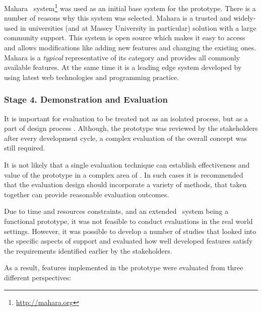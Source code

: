 Mahara \ep~system\footnote{\url{http://mahara.org}} was used as an initial base
system for the prototype. There is a number of reasons why this system was
selected. Mahara is a trusted and widely-used in universities (and at Massey
University in particular) solution with a large community support. This system
is open source which makes it easy to access and allows modifications like
adding new features and changing the existing ones. Mahara is a \textit{typical}
representative of its category and provides all commonly available features. At
the same time it is a leading edge system developed by using latest web
technologies and programming practice.

\subsubsection{Stage 4. Demonstration and Evaluation}

It is important for evaluation to be treated not as an isolated process, but as
a part of design process \citep{Cleven2009}. Although, the prototype was
reviewed by the stakeholders after every development cycle, a complex evaluation
of the overall concept was still required.

It is not likely that a single evaluation technique can establish effectiveness
and value of the prototype in a complex area of \LLLsn. In such cases it is
recommended \citep{Quinlan2008} that the evaluation design should incorporate a
variety of methods, that taken together can provide reasonable evaluation
outcomes.

Due to time and resources constraints, and an extended \ep~system being a
functional prototype, it was not feasible to conduct evaluations in the real
world settings. However, it was possible to develop a number of studies that
looked into the specific aspects of \LLLs support and evaluated how well
developed features satisfy the requirements identified earlier by the
stakeholders.
 
As a result, features implemented in the prototype were evaluated from three
different perspectives: 

